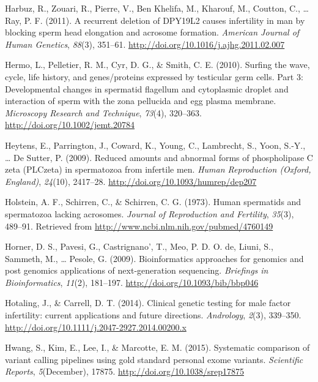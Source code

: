 \documentclass[12pt,twoside]{reedthesis}
\theoremstyle{definition}
\theoremstyle{definition}
\theoremstyle{remark}
\begin{document}
  \hypertarget{ref-Harbuz2011}{}
  Harbuz, R., Zouari, R., Pierre, V., Ben Khelifa, M., Kharouf, M.,
  Coutton, C., \ldots{} Ray, P. F. (2011). A recurrent deletion of DPY19L2
  causes infertility in man by blocking sperm head elongation and acrosome
  formation. \emph{American Journal of Human Genetics}, \emph{88}(3),
  351--61. \url{http://doi.org/10.1016/j.ajhg.2011.02.007}
  
  \hypertarget{ref-Hermo2010}{}
  Hermo, L., Pelletier, R. M., Cyr, D. G., \& Smith, C. E. (2010). Surfing
  the wave, cycle, life history, and genes/proteins expressed by
  testicular germ cells. Part 3: Developmental changes in spermatid
  flagellum and cytoplasmic droplet and interaction of sperm with the zona
  pellucida and egg plasma membrane. \emph{Microscopy Research and
  Technique}, \emph{73}(4), 320--363.
  \url{http://doi.org/10.1002/jemt.20784}
  
  \hypertarget{ref-Heytens2009}{}
  Heytens, E., Parrington, J., Coward, K., Young, C., Lambrecht, S., Yoon,
  S.-Y., \ldots{} De Sutter, P. (2009). Reduced amounts and abnormal forms
  of phospholipase C zeta (PLCzeta) in spermatozoa from infertile men.
  \emph{Human Reproduction (Oxford, England)}, \emph{24}(10), 2417--28.
  \url{http://doi.org/10.1093/humrep/dep207}
  
  \hypertarget{ref-Holstein1973}{}
  Holstein, A. F., Schirren, C., \& Schirren, C. G. (1973). Human
  spermatids and spermatozoa lacking acrosomes. \emph{Journal of
  Reproduction and Fertility}, \emph{35}(3), 489--91. Retrieved from
  \url{http://www.ncbi.nlm.nih.gov/pubmed/4760149}
  
  \hypertarget{ref-Horner2009}{}
  Horner, D. S., Pavesi, G., Castrignano', T., Meo, P. D. O. de, Liuni,
  S., Sammeth, M., \ldots{} Pesole, G. (2009). Bioinformatics approaches
  for genomics and post genomics applications of next-generation
  sequencing. \emph{Briefings in Bioinformatics}, \emph{11}(2), 181--197.
  \url{http://doi.org/10.1093/bib/bbp046}
  
  \hypertarget{ref-Hotaling2014}{}
  Hotaling, J., \& Carrell, D. T. (2014). Clinical genetic testing for
  male factor infertility: current applications and future directions.
  \emph{Andrology}, \emph{2}(3), 339--350.
  \url{http://doi.org/10.1111/j.2047-2927.2014.00200.x}
  
  \hypertarget{ref-Hwang2015}{}
  Hwang, S., Kim, E., Lee, I., \& Marcotte, E. M. (2015). Systematic
  comparison of variant calling pipelines using gold standard personal
  exome variants. \emph{Scientific Reports}, \emph{5}(December), 17875.
  \url{http://doi.org/10.1038/srep17875}
  
\end{document}
